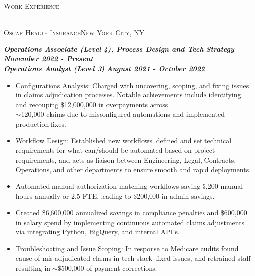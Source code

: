 \documentclass[a4paper]{article}
\newcommand{\lineunder} {
    \vspace*{-8pt} \\
    \hspace*{-18pt} \hrulefill \\
}
\newcommand{\header} [1] {
    {\hspace*{-18pt}\vspace*{6pt} \textsc{#1}}
    \vspace*{-6pt} \lineunder
}
\newcommand{\jobtitle} [1] {
    {\hspace*{-18pt} \textsc{#1}}
    
}
\begin{document}
\header{Work Experience}
\vspace{1mm}
\jobtitle{Oscar Health Insurance\hfill New York City, NY}
\hspace*{-16pt}\textit{\textbf{Operations Associate (Level 4), Process Design and Tech Strategy}} \hfill \textit{\textbf{November 2022 - Present}}\\
\hspace*{-16pt}\textit{\textbf{Operations Analyst (Level 3)}} \hfill \textit{\textbf{August 2021 - October 2022}}\\
\vspace{-1mm}
\begin{itemize}[leftmargin=10pt,align=left]
    \item Configurations Analysis: Charged with uncovering, scoping, and fixing issues in claims adjudication processes. 
        Notable achievements include identifying and recouping \$12,000,000 in overpayments across\\
        $\sim$120,000 claims due to misconfigured automations and implemented production fixes.

    \item   Workflow Design: Established new workflows, defined and set technical requirements for what can/should be automated based on project requirements,
     and acts as liaison between Engineering, Legal, Contracts, Operations, and other departments to ensure smooth and rapid deployments.
     \item Automated manual authorization matching workflows saving 5,200 manual hours annually or 2.5 FTE, leading to \$200,000 in admin savings.
     \item Created \$6,600,000 annualized savings in compliance penalties and \$600,000 in salary spend by implementing continuous automated claims adjustments via integrating Python, BigQuery, and internal API's. 
     
     \item 	Troubleshooting and Issue Scoping: In response to Medicare audits found cause of mis-adjudicated claims in tech stack, fixed issues, and retrained staff
     resulting in $\sim\$$500,000 of payment corrections.


\end{itemize}
\end{document}
